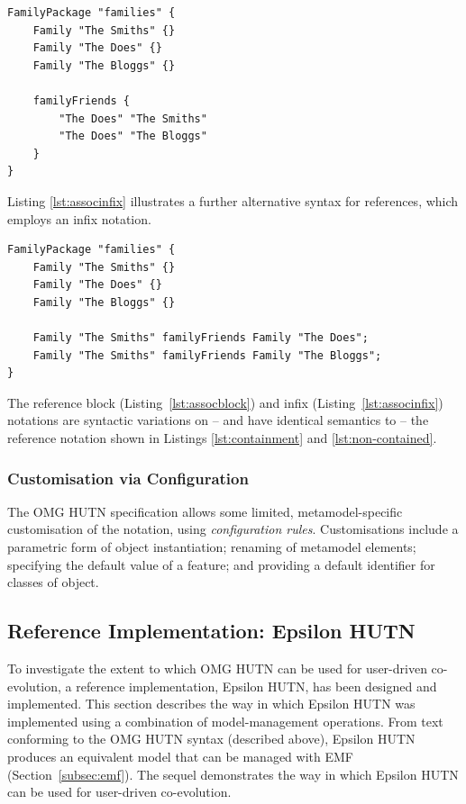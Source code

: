 \begin{lstlisting}[caption={[A reference block in HUTN]A reference block in HUTN, taken from \cite{rose08hutn}}, label=lst:assocblock, language=HutnFamilies]
FamilyPackage "families" {
    Family "The Smiths" {}
    Family "The Does" {}
    Family "The Bloggs" {}
    
    familyFriends {
        "The Does" "The Smiths"
        "The Does" "The Bloggs"
    }
}
\end{lstlisting}

Listing \ref{lst:associnfix} illustrates a further alternative syntax for references, which employs an infix notation. 

\begin{lstlisting}[caption={[An infix reference in HUTN]An infix reference in HUTN, taken from \cite{rose08hutn}}, label=lst:associnfix, language=HutnFamilies]
FamilyPackage "families" {
    Family "The Smiths" {}
    Family "The Does" {}
    Family "The Bloggs" {}
    
    Family "The Smiths" familyFriends Family "The Does";
    Family "The Smiths" familyFriends Family "The Bloggs";
}
\end{lstlisting}

The reference block (Listing~\ref{lst:assocblock}) and infix (Listing~\ref{lst:associnfix}) notations are syntactic variations on -- and have identical semantics to -- the reference notation shown in Listings \ref{lst:containment} and \ref{lst:non-contained}.


\subsubsection{Customisation via Configuration}
The OMG HUTN specification allows some limited, metamodel-specific customisation of the notation, using \emph{configuration rules}. Customisations include a parametric form of object instantiation; renaming of metamodel elements; specifying the default value of a feature; and providing a default identifier for classes of object.


\subsection{Reference Implementation: Epsilon HUTN}
\label{subsec:epsilon_hutn}
To investigate the extent to which OMG HUTN can be used for user-driven co-evolution, a reference implementation, Epsilon HUTN, has been designed and implemented. This section describes the way in which Epsilon HUTN was implemented using a combination of model-management operations. From text conforming to the OMG HUTN syntax (described above), Epsilon HUTN produces an equivalent model that can be managed with EMF (Section~\ref{subsec:emf}). The sequel demonstrates the way in which Epsilon HUTN can be used for user-driven co-evolution.

